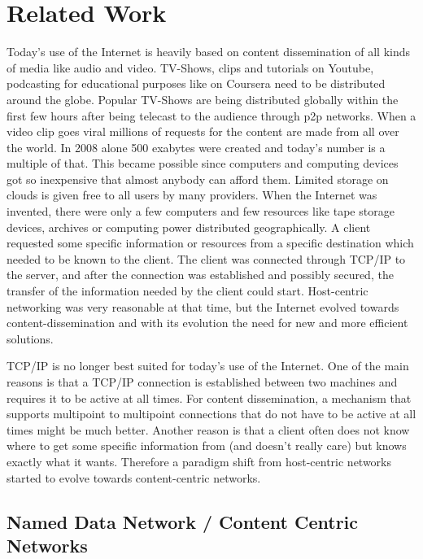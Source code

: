 \chapter{Related Work}

Today's use of the Internet is heavily based on content dissemination of all kinds of media like audio and video. TV-Shows, clips and tutorials on Youtube, podcasting for educational purposes like on Coursera need to be distributed around the globe. Popular TV-Shows are being distributed globally within the first few hours after being telecast to the audience through p2p networks. When a video clip goes viral millions of requests for the content are made from all over the world. In 2008 alone 500 exabytes were created and today's number is a multiple of that. This became possible since computers and computing devices got so inexpensive that almost anybody can afford them. Limited storage on clouds is given free to all users by many providers. When the Internet was invented, there were only a few computers and few resources like tape storage devices, archives or computing power distributed geographically. A client requested some specific information or resources from a specific destination which needed to be known to the client. The client was connected through TCP/IP to the server, and after the connection was established and possibly secured, the transfer of the information needed by the client could start. Host-centric networking was very reasonable at that time, but the Internet evolved towards content-dissemination and with its evolution the need for new and more efficient solutions.

\vspace{5mm} %

TCP/IP is no longer best suited for today's use of the Internet. One of the main reasons is that a TCP/IP connection is established between two machines and requires it to be active at all times. For content dissemination, a mechanism that supports multipoint to multipoint connections that do not have to be active at all times might be much better. Another reason is that a client often does not know where to get some specific information from (and doesn't really care) but knows exactly what it wants. Therefore a paradigm shift from host-centric networks started to evolve towards content-centric networks.

\newpage

\section{Named Data Network / Content Centric Networks}

